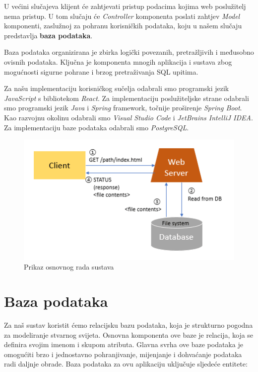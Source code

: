         \begingroup 
        U većini slučajeva klijent će zahtjevati pristup podacima kojima web poslužitelj nema pristup. U tom slučaju će \textit{Controller} komponenta poslati zahtjev \textit{Model} komponenti, zaslužnoj za pohranu korisničkih podataka, koju u našem slučaju predstavlja \textbf{baza podataka}. 
        \endgroup
        
        \begingroup
        Baza podataka organizirana je zbirka logički povezanih, pretražljivih i međusobno ovisnih podataka. Ključna je komponenta mnogih aplikacija i sustava zbog mogućnosti sigurne pohrane i brzog pretraživanja SQL upitima.
	  \endgroup

        \begingroup
        Za našu implementaciju korisničkog sučelja odabrali smo programski jezik \textit{JavaScript} s bibliotekom \textit{React}. Za implementaciju poslužiteljske strane odabrali smo programski jezik \textit{Java} i \textit{Spring} framework, točnije proširenje \textit{Spring Boot}. Kao razvojnu okolinu odabrali smo \textit{Visual Studio Code} i \textit{JetBrains IntelliJ IDEA}. Za implementaciju baze podataka odabrali smo \textit{PostgreSQL}.
        \endgroup

		\begin{figure}[h]
            \centering
            \includegraphics[width=1\textwidth]{slike/client-server-db.png}
            \caption{Prikaz osnovnog rada sustava}
            \label{fig:mesh1}
        \end{figure}

        \pagebreak
				
		\section{Baza podataka}
			
		\noindent Za naš sustav koristit ćemo relacijsku bazu podataka, koja je strukturno pogodna za modeliranje stvarnog svijeta. Osnovna komponenta ove baze je relacija, koja se definira svojim imenom i skupom atributa. Glavna svrha ove baze podataka je omogućiti brzo i jednostavno pohranjivanje, mijenjanje i dohvaćanje podataka radi daljnje obrade. Baza podataka za ovu aplikaciju uključuje sljedeće entitete:
		

